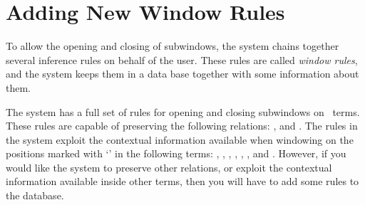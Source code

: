 \section{Adding New Window Rules}	\label{sec:win}

To allow the opening and closing of subwindows,
the system chains together several inference rules on behalf of the user.
These rules are called {\it window rules}, and the system keeps them
in a data base together with some information about them.

The system has a full set of rules for opening and closing
subwindows on \HOL\ terms.
These rules are capable of preserving the following relations:
,  and .
The rules in the system exploit the contextual
information available when windowing on the positions 
marked with `\ml{\_}' in the following
terms: , , , ,
, , and .
However, if you would like the system to preserve other relations,
or exploit the contextual information available inside other terms,
then you will have to add some rules to the database.

